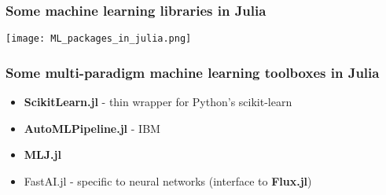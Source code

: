 \documentclass[t]{beamer}
\newcommand\df{\bf\color{Maroon}}
\begin{document}






\begin{frame}
  \frametitle{Some machine learning libraries in Julia}
   \begin{center}
    \texttt{[image: ML\_packages\_in\_julia.png]}
   \end{center}
\end{frame}

\begin{frame}
  \frametitle{Some multi-paradigm machine learning toolboxes in Julia}
  \begin{itemize}
  \item {\df ScikitLearn.jl} - thin wrapper for Python's scikit-learn
  \item {\df AutoMLPipeline.jl} - IBM
  \item {\df MLJ.jl}
  \item FastAI.jl - specific to neural networks (interface to {\df Flux.jl})
  \end{itemize}
\end{frame}
\end{document}
